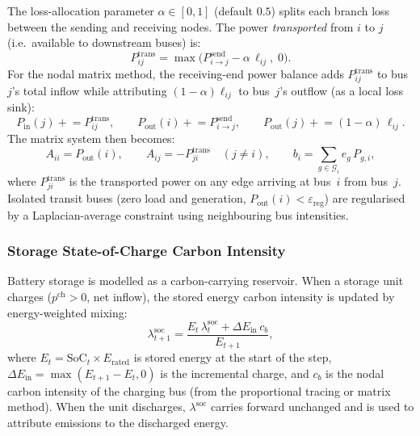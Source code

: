 The loss-allocation parameter $\alpha \in [0,1]$ (default $0.5$) splits
each branch loss between the sending and receiving nodes.  The power
\emph{transported} from $i$ to $j$ (i.e.\ available to downstream buses)
is:
\begin{equation}
  P_{ij}^{\text{trans}} = \max\!\bigl(P_{i\to j}^{\text{send}}
                           - \alpha\,\ell_{ij},\;0\bigr).
  \label{eq:carbon-transported}
\end{equation}
For the nodal matrix method, the receiving-end power balance adds
$P_{ij}^{\text{trans}}$ to bus~$j$'s total inflow while attributing
$(1-\alpha)\ell_{ij}$ to bus~$j$'s outflow (as a local loss sink):
\begin{equation}
  P_{\text{in}}(j) \mathrel{+}= P_{ij}^{\text{trans}}, \qquad
  P_{\text{out}}(i) \mathrel{+}= P_{i\to j}^{\text{send}}, \qquad
  P_{\text{out}}(j) \mathrel{+}= (1-\alpha)\,\ell_{ij}.
\end{equation}
The matrix system then becomes:
\begin{equation}
  A_{ii} = P_{\text{out}}(i), \qquad
  A_{ij} = -P_{ji}^{\text{trans}} \quad (j \neq i),
  \qquad b_i = \sum_{g \in \mathcal{G}_i} e_g\,P_{g,i},
  \label{eq:carbon-matrix-full}
\end{equation}
where $P_{ji}^{\text{trans}}$ is the transported power on any edge
arriving at bus~$i$ from bus~$j$.  Isolated transit buses (zero load
and generation, $P_{\text{out}}(i) < \varepsilon_{\text{reg}}$) are
regularised by a Laplacian-average constraint using neighbouring bus
intensities.

\subsubsection{Storage State-of-Charge Carbon Intensity}
\label{sec:carbon-storage}

Battery storage is modelled as a carbon-carrying reservoir.  When a
storage unit charges ($p^{\text{ch}} > 0$, net inflow), the stored
energy carbon intensity is updated by energy-weighted mixing:
\begin{equation}
  \lambda_{t+1}^{\text{soc}} =
    \frac{E_t\,\lambda_t^{\text{soc}} + \Delta E_{\text{in}}\,c_b}{E_{t+1}},
  \label{eq:storage-soc-carbon}
\end{equation}
where $E_t = \text{SoC}_t \times E_{\text{rated}}$ is stored energy at
the start of the step, $\Delta E_{\text{in}} = \max(E_{t+1}-E_t, 0)$
is the incremental charge, and $c_b$ is the nodal carbon intensity of
the charging bus (from the proportional tracing or matrix method).
When the unit discharges, $\lambda^{\text{soc}}$ carries forward
unchanged and is used to attribute emissions to the discharged energy.

